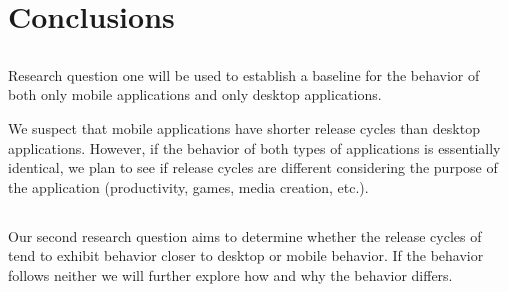 \documentclass{acm_proc_article-sp}
\begin{document}
\begin{center}

\label{tab:sumfeatures}
\end{center}

\begin{center}

\label{tab:bugs}
\end{center}

\begin{center}

\label{tab:sumBugs}
\end{center}

\begin{center}

\label{tab:nonFunc}
\end{center}

\begin{center}

\label{tab:sumNonFunc}
\end{center}

\begin{center}

\label{tab:mobileModel}
\end{center}

\begin{center}

\label{tab:desktopModel}
\end{center}

\begin{center}

\label{tab:sibModel}
\end{center}


\section{Conclusions}


\subsection{\RQOne }
Research question one will be used to establish a baseline for the behavior of both only mobile applications and only desktop applications.

We suspect that mobile applications have shorter release cycles than desktop applications.
However, if the behavior of both types of applications is essentially identical, we plan to see if release cycles are different considering the purpose of the application (\eg productivity, games, media creation, etc.).

\subsection{\RQTwo }
Our second research question aims to determine whether the release cycles of \sibs tend to exhibit behavior closer to desktop or mobile behavior. 
If the behavior follows neither we will further explore how and why the behavior differs.
\end{document}
